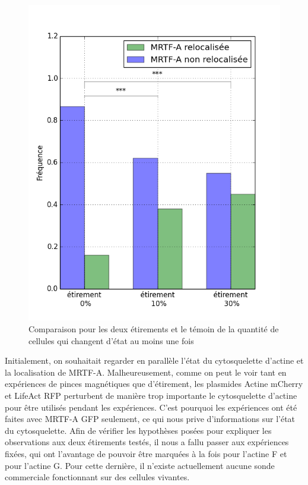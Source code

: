  \begin{figure}
 \includegraphics[scale=0.5]{Figures/Activite.png} 
 \caption{\label{Et30_ES} Comparaison pour les deux étirements et le témoin de la quantité de cellules qui changent d'état au moins une fois}
 \end{figure}
 
Initialement, on souhaitait regarder en parallèle l'état du cytosquelette d'actine et la localisation de MRTF-A. 
Malheureusement, comme on peut le voir tant en expériences de pinces magnétiques que d'étirement, les plasmides Actine mCherry et LifeAct RFP perturbent de manière trop importante le cytosquelette d'actine pour être utilisés pendant les expériences. 
C'est pourquoi les expériences ont été faites avec MRTF-A GFP seulement, ce qui nous prive d'informations sur l'état du cytosquelette.
Afin de vérifier les hypothèses posées pour expliquer les observations aux deux étirements testés, il nous a fallu passer aux expériences fixées, qui ont l'avantage de pouvoir être marquées à la fois pour l'actine F et pour l'actine G. Pour cette dernière, il n'existe actuellement aucune sonde commerciale fonctionnant sur des cellules vivantes. 

